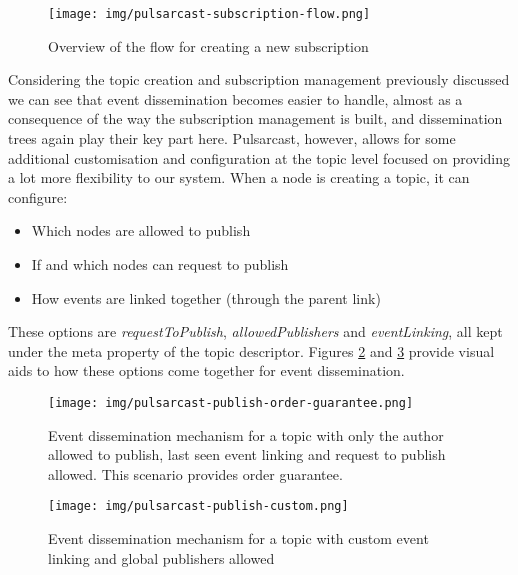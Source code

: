 \begin{figure}[hb!]
  \centering
  \texttt{[image: img/pulsarcast-subscription-flow.png]}
  \caption{Overview of the flow for creating a new subscription}
  \label{fig:pulsarcast-subscription-flow}
\end{figure}

Considering the topic creation and subscription management previously discussed
we can see that event dissemination becomes easier to handle, almost as a
consequence of the way the subscription management is built, and dissemination
trees again play their key part here. Pulsarcast, however, allows for some
additional customisation and configuration at the topic level focused on
providing a lot more flexibility to our system. When a node is creating a
topic, it can configure:
\begin{itemize}
  \item
    Which nodes are allowed to publish
  \item
     If and which nodes can request to publish
  \item
    How events are linked together (through the parent link)
\end{itemize}

These options are \emph{requestToPublish}, \emph{allowedPublishers} and
\emph{eventLinking}, all kept under the meta property of the topic descriptor.
Figures \ref{fig:pulsarcast-publish-order-guarantee} and
\ref{fig:pulsarcast-publish-custom} provide visual aids to how these options
come together for event dissemination.

\begin{figure}[hb!]
  \centering
  \texttt{[image: img/pulsarcast-publish-order-guarantee.png]}
  \caption{Event dissemination mechanism for a topic with only the author allowed to publish, last seen event linking and request to publish allowed. This scenario provides order guarantee.}
  \label{fig:pulsarcast-publish-order-guarantee}
\end{figure}

\begin{figure}[hb!]
  \centering
  \texttt{[image: img/pulsarcast-publish-custom.png]}
  \caption{Event dissemination mechanism for a topic with custom event linking and global publishers allowed}
  \label{fig:pulsarcast-publish-custom}
\end{figure}

